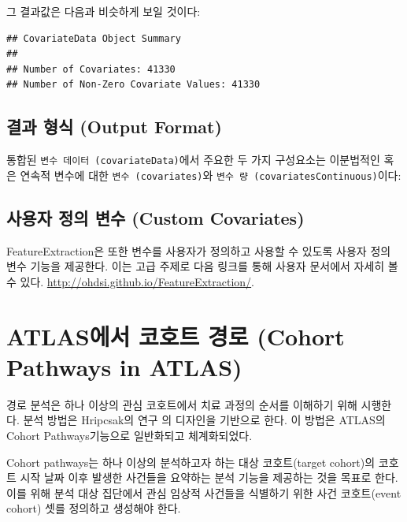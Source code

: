 \documentclass[11pt]{book}
\newenvironment{Shaded}{\begin{snugshade}}{\end{snugshade}}
\newcommand{\OperatorTok}[1]{\textcolor[rgb]{0.81,0.36,0.00}{\textbf{#1}}}
\newcommand{\NormalTok}[1]{#1}
\theoremstyle{definition}
\theoremstyle{definition}
\theoremstyle{definition}
\theoremstyle{remark}
\begin{document}
그 결과값은 다음과 비슷하게 보일 것이다:

\begin{verbatim}
## CovariateData Object Summary 
## 
## Number of Covariates: 41330 
## Number of Non-Zero Covariate Values: 41330
\end{verbatim}

\subsection{결과 형식 (Output Format)}\label{--output-format}

통합된 \texttt{변수\ 데이터\ (covariateData)}에서 주요한 두 가지
구성요소는 이분법적인 혹은 연속적 변수에 대한
\texttt{변수\ (covariates)}와
\texttt{변수\ 량\ (covariatesContinuous)}이다:

\begin{Shaded}
\end{Shaded}

\subsection{사용자 정의 변수 (Custom
Covariates)}\label{---custom-covariates}

FeatureExtraction은 또한 변수를 사용자가 정의하고 사용할 수 있도록
사용자 정의 변수 기능을 제공한다. 이는 고급 주제로 다음 링크를 통해
사용자 문서에서 자세히 볼 수 있다.
\url{http://ohdsi.github.io/FeatureExtraction/}.

\section{ATLAS에서 코호트 경로 (Cohort Pathways in
ATLAS)}\label{atlas---cohort-pathways-in-atlas}

경로 분석은 하나 이상의 관심 코호트에서 치료 과정의 순서를 이해하기 위해
시행한다. 분석 방법은 Hripcsak의 연구 \citep{Hripcsak7329} 의 디자인을
기반으로 한다. 이 방법은 ATLAS의 Cohort Pathways기능으로 일반화되고
체계화되었다.

Cohort pathways는 하나 이상의 분석하고자 하는 대상 코호트(target
cohort)의 코호트 시작 날짜 이후 발생한 사건들을 요약하는 분석 기능을
제공하는 것을 목표로 한다. 이를 위해 분석 대상 집단에서 관심 임상적
사건들을 식별하기 위한 사건 코호트(event cohort) 셋를 정의하고 생성해야
한다.
\end{document}
